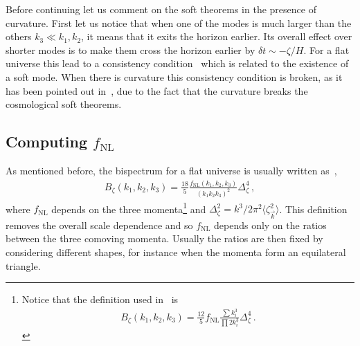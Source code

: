 \documentclass[a4paper,11pt]{article}
\numberwithin{equation}{section}
\def\k{{\vec{k}}}
\numberwithin{equation}{section}
\begin{document}
Before continuing let us comment on the soft theorems in the presence of  curvature. First let us notice  that when one of the modes is much larger than the others $k_3\ll k_1,k_2$, it means that it exits the horizon earlier. Its overall effect over shorter modes is to make them cross the horizon earlier by $\delta t\sim -\zeta/H$. For a flat universe this lead to a consistency condition~\cite{Maldacena:2002vr,Creminelli:2004yq} which is related to the existence of a soft mode. When there is curvature this consistency condition is broken, as it has been pointed out in~\cite{Avis:2019eav}, due to the fact that the curvature breaks the cosmological soft theorems.


\subsection{Computing $f_\mathrm{{NL}}$}

As mentioned before, the bispectrum for a flat universe is usually written as~\cite{Baumann:2014nda},
\begin{align}
B_\zeta(k_1,k_2,k_3)=\frac{18}{5}\frac{f_{\mathrm{NL}}(k_1,k_2,k_3)}{(k_1k_2k_3)^2}\Delta_\zeta^4 \,, \label{eq:flatFnl}
\end{align}
where $f_\mathrm{{NL}}$  depends on the three momenta\footnote{Notice that the definition used in~\cite{Maldacena:2002vr,Clunan:2009ib} is \begin{align}
B_\zeta(k_1,k_2,k_3)=\frac{12}{5}f_{\mathrm{NL}}\frac{\sum k_i^3}{\prod 2 k_i^3}\Delta_\zeta^4 \,.
\end{align} } and $\Delta_\zeta^2=k^3/2\pi^2 \langle\zeta_\k^2\rangle$. This definition removes the overall scale dependence and so $f_\mathrm{{NL}}$ depends only on the ratios between the three comoving momenta. Usually the ratios are then fixed by considering  different shapes, for instance when the momenta form an equilateral triangle. 
\end{document}
